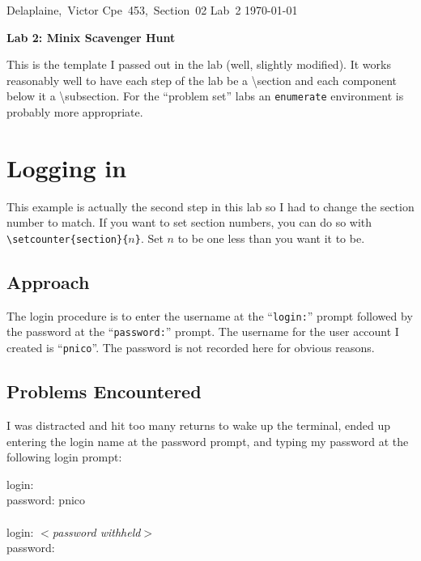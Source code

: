 \documentclass[11pt]{article}
\begin{document}
\hfill\vbox{\hbox{Delaplaine, Victor}
		\hbox{Cpe 453, Section 02}	
		\hbox{Lab 2}	
		\hbox{\today}}\par

\bigskip
\centerline{\Large\bf Lab 2: Minix Scavenger Hunt}\par
\bigskip

This is the template I passed out in the lab (well, slightly 
modified).  It works reasonably well to have each step of the
lab be a {\textbackslash section} and each component below it
a {\textbackslash subsection}.  For the ``problem set'' labs
an {\tt enumerate} environment is probably more appropriate.


\setcounter{section}{1} %
\section{Logging in}

This example is actually the second step in this lab so I had
to change the section number to match.  If you want to
set section numbers, you can do so with 
\verb+\setcounter{section}{+$n${\tt \}}.  Set $n$ to be one less
than you want it to be.


\subsection{Approach}
  The login procedure is to enter the username at the ``{\tt login:}''
prompt followed by the password at the ``{\tt password:}'' prompt.
The username for the user account I created is ``{\tt pnico}''.  The
password is not recorded here for obvious reasons.

\subsection{Problems Encountered}

  I was distracted and hit too many returns to wake up the terminal, 
ended up entering the login name at the password prompt, and typing
my password at the following login prompt:

{\tt\begin{tabbing}
login:\\
password: pnico\\
\\
login: $<${\it password withheld}$>$\\
password:
\end{tabbing}}
\end{document}
